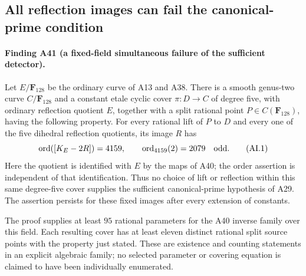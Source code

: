 \subsection{All reflection images can fail the canonical-prime condition}

\paragraph{Finding A41 (a fixed-field simultaneous failure of the sufficient detector).}
Let $E/\mathbf F_{128}$ be the ordinary curve of A13 and A38.
There is a smooth genus-two curve $C/\mathbf F_{128}$ and a
constant etale cyclic cover $\pi:D\to C$ of degree five,
with ordinary reflection quotient $E$, together with a split
rational point $P\in C(\mathbf F_{128})$, having the following
property. For every rational lift of $P$ to $D$ and every
one of the five dihedral reflection quotients, its image
$R$ has
\[
                  \operatorname{ord}([K_E-2R])=4159,
             \qquad \operatorname{ord}_{4159}(2)=2079
                         \quad\hbox{odd}.
 \tag{AI.1}
\]
Here the quotient is identified with $E$ by the maps of A40;
the order assertion is independent of that identification.
Thus no choice of lift or reflection within this same
degree-five cover supplies the sufficient canonical-prime
hypothesis of A29. The assertion persists for these fixed
images after every extension of constants.

The proof supplies at least $95$ rational parameters for
the A40 inverse family over this field. Each resulting
cover has at least eleven distinct rational split source
points with the property just stated. These are existence
and counting statements in an explicit algebraic family;
no selected parameter or covering equation is claimed to
have been individually enumerated.

